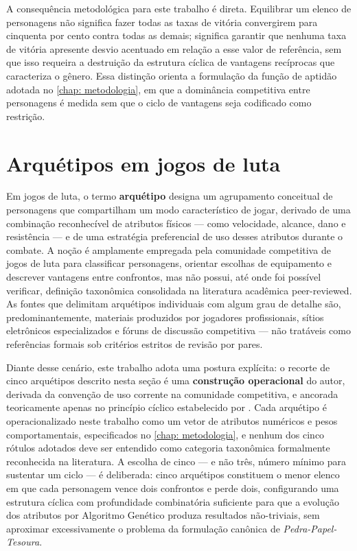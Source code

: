 A consequência metodológica para este trabalho é direta. Equilibrar um elenco de personagens não significa fazer todas as taxas de vitória convergirem para cinquenta por cento contra todas as demais; significa garantir que nenhuma taxa de vitória apresente desvio acentuado em relação a esse valor de referência, sem que isso requeira a destruição da estrutura cíclica de vantagens recíprocas que caracteriza o gênero. Essa distinção orienta a formulação da função de aptidão adotada no \autoref{chap: metodologia}, em que a dominância competitiva entre personagens é medida sem que o ciclo de vantagens seja codificado como restrição.

\section{Arquétipos em jogos de luta}
\label{sec: arquetipos}

Em jogos de luta, o termo \textbf{arquétipo} designa um agrupamento conceitual de personagens que compartilham um modo característico de jogar, derivado de uma combinação reconhecível de atributos físicos --- como velocidade, alcance, dano e resistência --- e de uma estratégia preferencial de uso desses atributos durante o combate. A noção é amplamente empregada pela comunidade competitiva de jogos de luta para classificar personagens, orientar escolhas de equipamento e descrever vantagens entre confrontos, mas não possui, até onde foi possível verificar, definição taxonômica consolidada na literatura acadêmica peer-reviewed. As fontes que delimitam arquétipos individuais com algum grau de detalhe são, predominantemente, materiais produzidos por jogadores profissionais, sítios eletrônicos especializados e fóruns de discussão competitiva --- não tratáveis como referências formais sob critérios estritos de revisão por pares.

Diante desse cenário, este trabalho adota uma postura explícita: o recorte de cinco arquétipos descrito nesta seção é uma \textbf{construção operacional} do autor, derivada da convenção de uso corrente na comunidade competitiva, e ancorada teoricamente apenas no princípio cíclico estabelecido por . Cada arquétipo é operacionalizado neste trabalho como um vetor de atributos numéricos e pesos comportamentais, especificados no \autoref{chap: metodologia}, e nenhum dos cinco rótulos adotados deve ser entendido como categoria taxonômica formalmente reconhecida na literatura. A escolha de cinco --- e não três, número mínimo para sustentar um ciclo --- é deliberada: cinco arquétipos constituem o menor elenco em que cada personagem vence dois confrontos e perde dois, configurando uma estrutura cíclica com profundidade combinatória suficiente para que a evolução dos atributos por Algoritmo Genético produza resultados não-triviais, sem aproximar excessivamente o problema da formulação canônica de \textit{Pedra-Papel-Tesoura}.

